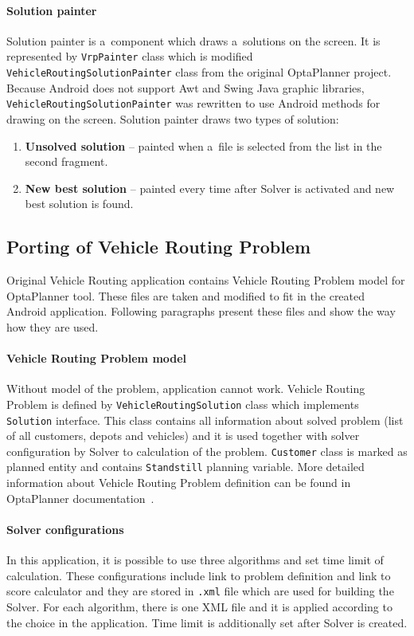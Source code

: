 \paragraph{Solution painter}
Solution painter is a~component which draws a~solutions on the screen. It is represented by \texttt{VrpPainter} class
which is modified \texttt{VehicleRoutingSolutionPainter} class from the original OptaPlanner project. Because Android
does not support Awt and Swing Java graphic libraries, \texttt{VehicleRoutingSolutionPainter} was rewritten to use
Android methods for drawing on the screen. Solution painter draws two types of solution:

\begin{enumerate}
    \item \textbf{Unsolved solution} --  painted when a~file is selected from the list in the second fragment.
    \item \textbf{New best solution} -- painted every time after Solver is activated and new best solution is found.
\end{enumerate}

\subsection{Porting of Vehicle Routing Problem}
Original Vehicle Routing application contains Vehicle Routing Problem model for OptaPlanner tool. These files are taken
and modified to fit in the created Android application. Following paragraphs present these files and show the way how
they are used.

\paragraph{Vehicle Routing Problem model}
Without model of the problem, application cannot work. Vehicle Routing Problem is defined by
\texttt{VehicleRoutingSolution} class which implements \texttt{Solution} interface. This class contains all information
about solved problem (list of all customers, depots and vehicles) and it is used together with solver configuration
by Solver to calculation of the problem. \texttt{Customer} class is marked as planned entity and contains
\texttt{Standstill} planning variable. More detailed information about Vehicle Routing Problem definition can be found
in OptaPlanner documentation~\cite{OptaPlannerDoc}.

\paragraph{Solver configurations}
In this application, it is possible to use three algorithms and set time limit of calculation. These configurations
include link to problem definition and link to score calculator and they are stored in \texttt{.xml} file which are used
for building the Solver. For each algorithm, there is one XML file and it is applied according to the choice in the
application. Time limit is additionally set after Solver is created.

